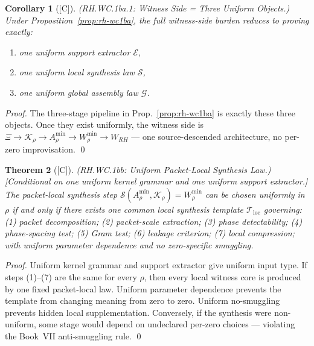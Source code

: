 \documentclass[12pt,oneside]{amsbook}
\theoremstyle{plain}
\newtheorem{theorem}{Theorem}[section]
\newtheorem{corollary}[theorem]{Corollary}
\theoremstyle{definition}
\theoremstyle{remark}
\newcommand{\status}[1]{\textup{[#1]}}
\begin{document}
\begin{corollary}[\status{C}]\label{cor:rh-wc1ba1}
\textup{(RH.WC.1ba.1: Witness Side = Three Uniform Objects.)}
Under Proposition~\ref{prop:rh-wc1ba}, the full witness-side burden
reduces to proving exactly:
\begin{enumerate}[label=\textup{(\arabic*)}]
 \item one uniform support extractor $\mathcal{E}$,
 \item one uniform local synthesis law $\mathcal{S}$,
 \item one uniform global assembly law $\mathcal{G}$.
\end{enumerate}
\end{corollary}

\begin{proof}
The three-stage pipeline in Prop.~\ref{prop:rh-wc1ba} is exactly
these three objects. Once they exist uniformly, the witness side
is $\Xi \to \mathcal{K}_\rho \to A_\rho^{\min} \to W_\rho^{\min}
\to W_{RH}$ --- one source-descended architecture, no per-zero
improvisation. \qed
\end{proof}

\begin{theorem}[\status{C}]\label{thm:rh-wc1bb}
\textup{(RH.WC.1bb: Uniform Packet-Local Synthesis Law.)}
\textup{[Conditional on one uniform kernel grammar and one uniform
support extractor.]}
The packet-local synthesis step $\mathcal{S}(A_\rho^{\min},
\mathcal{K}_\rho) = W_\rho^{\min}$ can be chosen uniformly in
$\rho$ if and only if there exists one common local synthesis
template $\mathcal{T}_{\mathrm{loc}}$ governing: (1) packet
decomposition; (2) packet-scale extraction; (3) phase detectability;
(4) phase-spacing test; (5) Gram test; (6) leakage criterion;
(7) local compression; with uniform parameter dependence and
no zero-specific smuggling.
\end{theorem}

\begin{proof}
Uniform kernel grammar and support extractor give uniform input
type. If steps (1)--(7) are the same for every $\rho$, then every
local witness core is produced by one fixed packet-local law.
Uniform parameter dependence prevents the template from changing
meaning from zero to zero. Uniform no-smuggling prevents hidden
local supplementation. Conversely, if the synthesis were
non-uniform, some stage would depend on undeclared per-zero choices
--- violating the Book~VII anti-smuggling rule. \qed
\end{proof}
\end{document}
